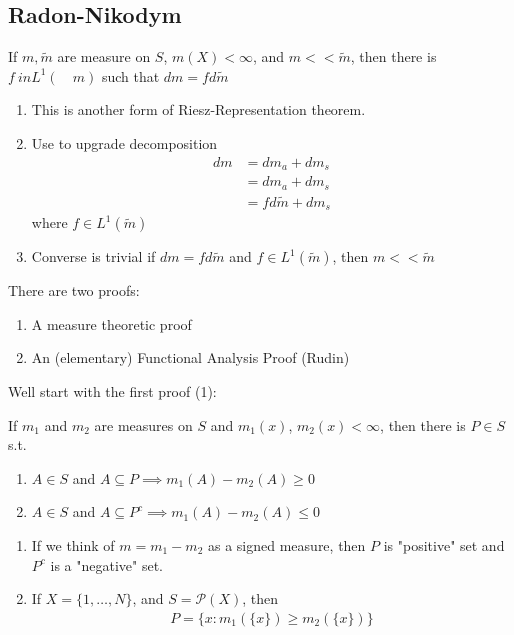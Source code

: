 \subsection{Radon-Nikodym}

\begin{theorem}
	If $m, \tilde{m}$ are measure on $S$, $m(X) < \infty$, and $m << \tilde{m}$, then there is $f \ in L^{1} ( \quad{m})$ such that
	$dm = f d\tilde{m}$
\end{theorem}

\begin{remark}
	\begin{enumerate}
		\item This is another form of Riesz-Representation theorem.
		\item Use to upgrade decomposition
			\begin{align*}
				dm &= dm_{a} + dm_s \\
				   &= dm_a + dm_s \\
				   &= f d\tilde{m} + d m_{s}
			\end{align*} where $f \in L^{1} (\tilde m)$
		\item Converse is trivial if $dm = f d \tilde{m}$ and
			$f \in L^1 (\tilde{m} )$, then $m << \tilde{m}$
	\end{enumerate}
\end{remark}

There are two proofs:
\begin{enumerate}
	\item A measure theoretic proof
	\item An (elementary) Functional Analysis Proof (Rudin)
\end{enumerate}

Well start with the first proof (1):

\begin{theorem} If $m_1$ and $m_2$ are measures on $S$ and $m_1 (x)$, $m_2 (x) < \infty$, then there is $P \in S$ s.t.
	\begin{enumerate}
		\item $A \in S$ and $A \subseteq P \implies m_1 (A) - m_2 (A) \geq 0$ \\
		\item $A \in S$ and $A \subseteq P^c \implies m_1 (A) - m_2 (A) \leq 0$ \\
	\end{enumerate}
\end{theorem}


\begin{remark}
	\begin{enumerate}
		\item If we think of $m = m_1 - m_2$ as a signed measure, then $P$ is "positive" set and $P^c$ is a "negative" set.
		\item If $X = \{1, \ldots, N\}$, and $S = \mathcal{P} (X)$, then
			\begin{align*}
				P = \{x : m_{1} (\{x\}) \geq m_2 (\{ x \})\}
			\end{align*} 
	\end{enumerate}
\end{remark}

